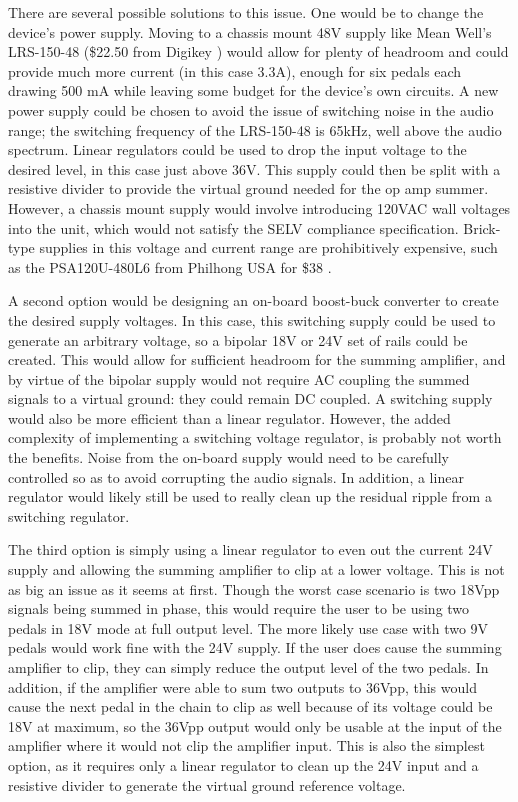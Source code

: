 \documentclass{article}
\begin{document}
	There are several possible solutions to this issue.  One would be to change the device's power supply.  Moving to a chassis mount 48V supply like Mean Well's LRS-150-48 \cite{datasheet:LRS-150-48} (\$22.50 from Digikey \cite{Digikey:LRS-150-48}) would allow for plenty of headroom and could provide much more current (in this case 3.3A), enough for six pedals each drawing 500 mA while leaving some budget for the device's own circuits.  A new power supply could be chosen to avoid the issue of switching noise in the audio range; the switching frequency of the LRS-150-48 is 65kHz, well above the audio spectrum.  Linear regulators could be used to drop the input voltage to the desired level, in this case just above 36V.  This supply could then be split with a resistive divider to provide the virtual ground needed for the op amp summer.  However, a chassis mount supply would involve introducing 120VAC wall voltages into the unit, which would not satisfy the SELV compliance specification.  Brick-type supplies in this voltage and current range are prohibitively expensive, such as the PSA120U-480L6 from Philhong USA for \$38 \cite{Digikey:PSA120U-480L6}.

	A second option would be designing an on-board boost-buck converter to create the desired supply voltages.  In this case, this switching supply could be used to generate an arbitrary voltage, so a bipolar 18V or 24V set of rails could be created.  This would allow for sufficient headroom for the summing amplifier, and by virtue of the bipolar supply would not require AC coupling the summed signals to a virtual ground: they could remain DC coupled.  A switching supply would also be more efficient than a linear regulator.  However, the added complexity of implementing a switching voltage regulator, is probably not worth the benefits.  Noise from the on-board supply would need to be carefully controlled so as to avoid corrupting the audio signals.  In addition, a linear regulator would likely still be used to really clean up the residual ripple from a switching regulator.

	The third option is simply using a linear regulator to even out the current 24V supply and allowing the summing amplifier to clip at a lower voltage.  This is not as big an issue as it seems at first.  Though the worst case scenario is two 18Vpp signals being summed in phase, this would require the user to be using two pedals in 18V mode at full output level.  The more likely use case with two 9V pedals would work fine with the 24V supply.  If the user does cause the summing amplifier to clip, they can simply reduce the output level of the two pedals.  In addition, if the amplifier were able to sum two outputs to 36Vpp, this would cause the next pedal in the chain to clip as well because of its voltage could be 18V at maximum, so the 36Vpp output would only be usable at the input of the amplifier where it would not clip the amplifier input.  This is also the simplest option, as it requires only a linear regulator to clean up the 24V input and a resistive divider to generate the virtual ground reference voltage.  
\end{document}
